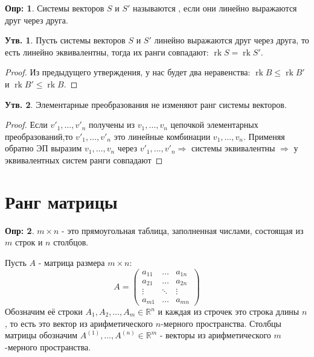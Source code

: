 \documentclass[12pt]{article}
\newcommand{\MR}{\mathbb{R}}
\theoremstyle{definition}
\newtheorem{defn}{Опр:}
\newtheorem{prop}{Утв.}
\DeclareMathOperator{\rk}{\text{rk}}
\begin{document}
\begin{defn}
	Системы векторов $S$ и $S'$ называются , если они линейно выражаются друг через друга.
\end{defn}
\begin{prop}
	Пусть системы векторов $S$ и $S'$ линейно выражаются друг через друга, то есть линейно эквивалентны, тогда их ранги совпадают: $\rk{S} = \rk{S'}$.
\end{prop}
\begin{proof}
	Из предыдущего утверждения, у нас будет два неравенства: $\rk{B} \leq \rk{B'}$ и $\rk{B'} \leq \rk{B}$.
\end{proof}
\begin{prop}
	Элементарные преобразования не изменяют ранг системы векторов.
\end{prop}
\begin{proof}
	Если $v'_1, \dotsc, v'_n$ получены из $v_1, \dotsc, v_n$ цепочкой элементарных преобразований,то $v'_1, \dotsc, v'_n$ это линейные комбинации $v_1, \dotsc, v_n$. Применяя обратно ЭП выразим $v_1, \dotsc, v_n$ через $v'_1, \dotsc, v'_n \Rightarrow$ системы эквивалентны $\Rightarrow$ у эквивалентных систем ранги совпадают
\end{proof}

\section*{Ранг матрицы}
\begin{defn}
	 $m \times n$ - это прямоугольная таблица, заполненная числами, состоящая из $m$ строк и $n$ столбцов.
\end{defn}
Пусть $A$ - матрица размера $m\times n$:
$$
	A = 
	\begin{pmatrix}
		a_{11} & \dotsc & a_{1n}\\
		a_{21} & \dotsc & a_{2n}\\
		\vdots & \ddots & \vdots \\
		a_{m1} & \dotsc & a_{mn}
	\end{pmatrix}
$$
Обозначим её строки $A_1, A_2, \dotsc, A_m \in \MR^n$ и каждая из строчек это строка длины $n$, то есть это вектор из арифметического $n$-мерного пространства. Столбцы матрицы обозначим $A^{(1)}, \dotsc, A^{(n)} \in \MR^m$ - векторы из арифметического $m$-мерного пространства.
\end{document}
